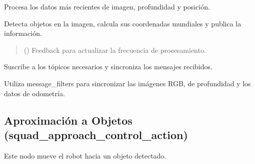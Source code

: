 \documentclass[a4paper,10pt,spanish]{sphinxmanual}
\begin{document}
\begin{fulllineitems}
\begin{fulllineitems}
\label{\detokenize{squad_object_detection_action:squad_object_detection_action.TurtleBotObjectDetectionAction.process_latest_data}}
\pysigstartsignatures
{}
\pysigstopsignatures
\sphinxAtStartPar
Procesa los datos más recientes de imagen, profundidad y posición.

\sphinxAtStartPar
Detecta objetos en la imagen, calcula sus coordenadas mundiales y publica la información.
\begin{quote}\begin{description}
\sphinxAtStartPar
{} () \textendash{} Feedback para actualizar la frecuencia de procesamiento.

\end{description}\end{quote}

\end{fulllineitems}


\begin{fulllineitems}
\label{\detokenize{squad_object_detection_action:squad_object_detection_action.TurtleBotObjectDetectionAction.subscribe_to_topics}}
\pysigstartsignatures
{}
\pysigstopsignatures
\sphinxAtStartPar
Suscribe a los tópicos necesarios y sincroniza los mensajes recibidos.

\sphinxAtStartPar
Utiliza message\_filters para sincronizar las imágenes RGB, de profundidad y los datos de odometría.

\end{fulllineitems}


\end{fulllineitems}


\sphinxstepscope


\subsection{Aproximación a Objetos (squad\_approach\_control\_action)}
\label{\detokenize{squad_approach_control_action:aproximacion-a-objetos-squad-approach-control-action}}\label{\detokenize{squad_approach_control_action::doc}}
\sphinxAtStartPar
Este nodo mueve el robot hacia un objeto detectado.
\end{document}
